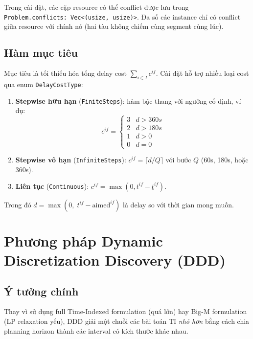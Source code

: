 \documentclass[11pt,a4paper]{article}
\begin{document}
Trong cài đặt, các cặp resource có thể conflict được lưu trong \texttt{Problem.conflicts: Vec<(usize, usize)>}. Đa số các instance chỉ có conflict giữa resource với chính nó (hai tàu không chiếm cùng segment cùng lúc).

\subsection{Hàm mục tiêu}

Mục tiêu là tối thiểu hóa tổng delay cost $\sum_{i \in I} c^{if}$. Cài đặt hỗ trợ nhiều loại cost qua enum \texttt{DelayCostType}:

\begin{enumerate}
  \item \textbf{Stepwise hữu hạn} (\texttt{FiniteSteps}): hàm bậc thang với ngưỡng cố định, ví dụ:
  \[
  c^{if} = \begin{cases} 3 & d > 360s \\ 2 & d > 180s \\ 1 & d > 0 \\ 0 & d = 0 \end{cases}
  \]

  \item \textbf{Stepwise vô hạn} (\texttt{InfiniteSteps}): $c^{if} = \lceil d / Q \rceil$ với bước $Q$ (60s, 180s, hoặc 360s).

  \item \textbf{Liên tục} (\texttt{Continuous}): $c^{if} = \max(0, t^{if} - \underline{t}^{if})$.
\end{enumerate}

\noindent Trong đó $d = \max(0,\; t^{if} - \text{aimed}^{if})$ là delay so với thời gian mong muốn.


\section{Phương pháp Dynamic Discretization Discovery (DDD)}

\subsection{Ý tưởng chính}

Thay vì sử dụng full Time-Indexed formulation (quá lớn) hay Big-M formulation (LP relaxation yếu), DDD giải một chuỗi các bài toán TI \emph{nhỏ hơn} bằng cách chia planning horizon thành các interval có kích thước khác nhau.
\end{document}
